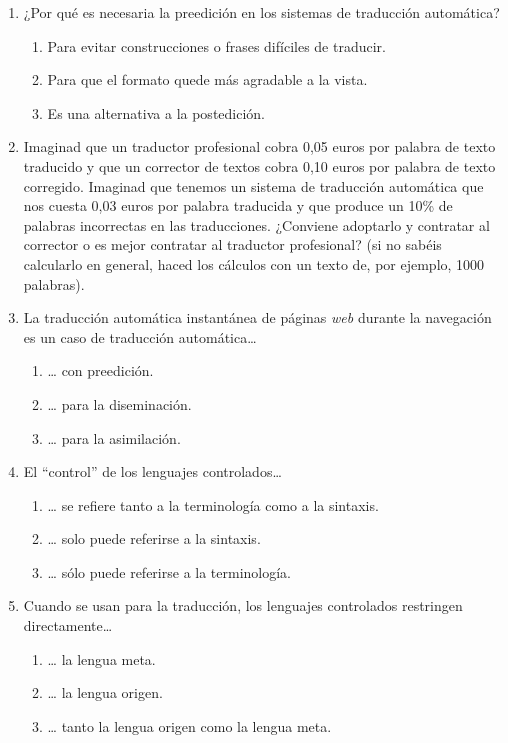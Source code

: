 \begin{enumerate}
\item ¿Por qué es necesaria la preedición en los sistemas de traducción automática? \begin{enumerate} \item Para evitar construcciones o frases difíciles de traducir. \item Para que el formato quede más agradable a la vista. \item Es una alternativa a la postedición. \end{enumerate} 

\item Imaginad que un traductor profesional cobra 0,05 euros por palabra de texto traducido y que un corrector de textos cobra 0,10 euros por palabra de texto corregido. Imaginad que tenemos un sistema de traducción automática que nos cuesta 0,03 euros por palabra traducida y que produce un 10\% de palabras incorrectas en las traducciones. ¿Conviene adoptarlo y contratar al corrector o es mejor contratar al traductor profesional? (si no sabéis calcularlo en general, haced los cálculos con un texto de, por ejemplo, 1000 palabras). 

\item La traducción automática instantánea de páginas \emph{web} durante la navegación es un caso de traducción automática{\ldots} \begin{enumerate} \item {\ldots} con preedición. \item {\ldots} para la diseminación. \item {\ldots} para la asimilación. \end{enumerate} 

\item El ``control'' de los lenguajes controlados{\ldots} \begin{enumerate} \item {\ldots} se refiere tanto a la terminología como a la sintaxis. \item {\ldots} solo puede referirse a la sintaxis. \item {\ldots} sólo puede referirse a la terminología. \end{enumerate} 

\item Cuando se usan para la traducción, los lenguajes controlados restringen directamente{\ldots} \begin{enumerate} \item {\ldots} la lengua meta. \item {\ldots} la lengua origen. \item {\ldots} tanto la lengua origen como la lengua meta. \end{enumerate} 


\end{enumerate}
